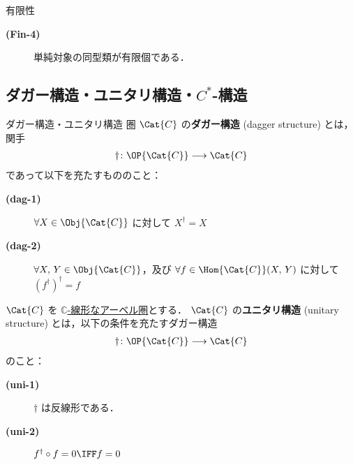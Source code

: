 \documentclass[TQFT_main]{subfiles}
\begin{document}
\begin{mydef}[label=def:finite-abcat]{有限性}
\begin{itemize}
\begin{description}
                \item[\textbf{(Fin-4)}] 単純対象の同型類が有限個である．
            \end{description}
        \end{itemize}
        
    \end{mydef}

    \subsection{ダガー構造・ユニタリ構造・$C^*$-構造}

    \begin{mydef}[label=redef:unitary]{ダガー構造・ユニタリ構造}
        圏 $\Cat{C}$ の\textbf{ダガー構造} (dagger structure) とは，関手
        \begin{align}
            \dagger \colon \OP{\Cat{C}} \lto \Cat{C}
        \end{align}
        であって以下を充たすもののこと：
        \begin{description}
            \item[\textbf{(dag-1)}] $\forall X \in \Obj{\Cat{C}}$ に対して $X^\dagger = X$
            \item[\textbf{(dag-2)}] $\forall X,\, Y \in \Obj{\Cat{C}}$，及び $\forall f \in \Hom{\Cat{C}}(X,\, Y)$ に対して $(f^\dagger)^\dagger = f$
        \end{description}
        
        \tcblower

        $\Cat{C}$ を \hyperref[def:additive-cat]{$\mathbb{C}$-線形なアーベル圏}とする．
        $\Cat{C}$ の\textbf{ユニタリ構造} (unitary structure) とは，以下の条件を充たすダガー構造
        \begin{align}
            \dagger \colon \OP{\Cat{C}} \lto \Cat{C}
        \end{align}
        のこと：
        \begin{description}
            \item[\textbf{(uni-1)}] $\dagger$ は反線形である．
            \item[\textbf{(uni-2)}] $f^\dagger \circ f = 0 \IFF f = 0$
        \end{description}
    
    \end{mydef}
    
\end{document}
